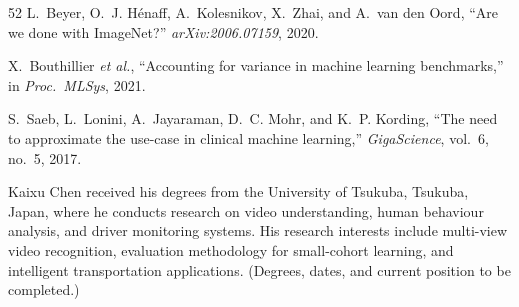 \documentclass[journal]{IEEEtran}
\begin{document}
\begin{thebibliography}{52}
 L.~Beyer, O.~J. H\'enaff, A.~Kolesnikov, X.~Zhai,
and A.~van den Oord, ``Are we done with ImageNet?''
\emph{arXiv:2006.07159}, 2020.

 X.~Bouthillier \emph{et al.},
``Accounting for variance in machine learning benchmarks,'' in
\emph{Proc.\ MLSys}, 2021.

 S.~Saeb, L.~Lonini, A.~Jayaraman, D.~C. Mohr, and
K.~P. Kording, ``The need to approximate the use-case in clinical machine
learning,'' \emph{GigaScience}, vol.~6, no.~5, 2017.


\end{thebibliography}

\begin{IEEEbiographynophoto}{Kaixu Chen}
received his degrees from the University of Tsukuba, Tsukuba, Japan, where
he conducts research on video understanding, human behaviour analysis, and
driver monitoring systems.  His research interests include multi-view video
recognition, evaluation methodology for small-cohort learning, and
intelligent transportation applications.  (Degrees, dates, and current
position to be completed.)
\end{IEEEbiographynophoto}
\end{document}
